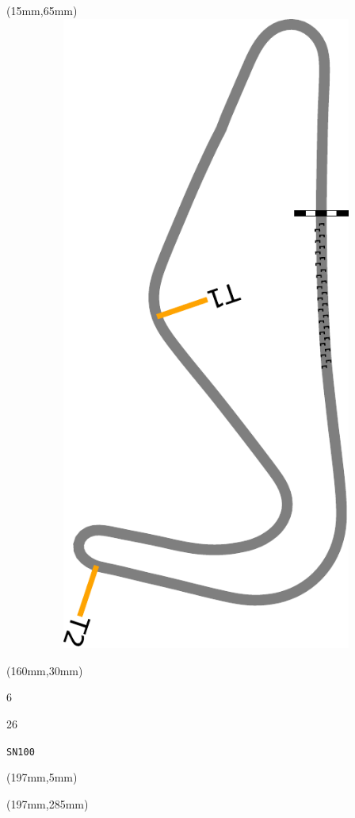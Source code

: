 \begin{textblock*}{185mm}(15mm,65mm)%
\centering
\mbox{\includegraphics[width=185mm,height=210mm,keepaspectratio]{PT/SN100.pdf}}
\end{textblock*}
\begin{textblock*}{40mm}(160mm,30mm)%
\Large
\par{} 
\par6 
\par26 
\par\hfill\tiny\tt SN100\\
\end{textblock*}
\begin{textblock*}{20mm}(197mm,5mm)%
\fbox{\thepage}
\label{SN100}
\end{textblock*}
\begin{textblock*}{20mm}(197mm,285mm)%
\fbox{\thepage}
\end{textblock*}

